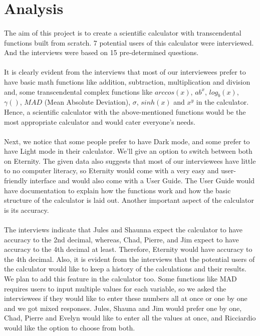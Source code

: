 \section{Analysis}
    \paragraph{}
    The aim of this project is to create a scientific calculator with transcendental functions built from scratch. 7 potential users of this calculator were interviewed. And the interviews were based on 15 pre-determined questions.

    \paragraph{}
    It is clearly evident from the interviews that most of our interviewees prefer to have basic math functions like addition, subtraction, multiplication and division and, some transcendental complex functions like $arccos(x)$, $ab^x$, $log_b(x)$, $\gamma ()$, $MAD$ (Mean Absolute Deviation), $\sigma$, $sinh(x)$ and $x^y$ in the calculator. Hence, a scientific calculator with the above-mentioned functions would be the most appropriate calculator and would cater everyone’s needs.

    \paragraph{}
    Next, we notice that some people prefer to have Dark mode, and some prefer to have Light mode in their calculator. We’ll give an option to switch between both on Eternity. The given data also suggests that most of our interviewees have little to no computer literacy, so Eternity would come with a very easy and user-friendly interface and would also come with a User Guide. The User Guide would have documentation to explain how the functions work and how the basic structure of the calculator is laid out. Another important aspect of the calculator is its accuracy.

    \paragraph{}
    The interviews indicate that Jules and Shaunna expect the calculator to have accuracy to the 2nd decimal, whereas, Chad, Pierre, and Jim expect to have accuracy to the 4th decimal at least. Therefore, Eternity would have accuracy to the 4th decimal. Also, it is evident from the interviews that the potential users of the calculator would like to keep a history of the calculations and their results. We plan to add this feature in the calculator too. Some functions like MAD  requires users to input multiple values for each variable, so we asked the interviewees if they would like to enter these numbers all at once or one by one and we got mixed responses. Jules, Shauna and Jim would prefer one by one, Chad, Pierre and Evelyn would like to enter all the values at once, and Ricciardio would like the option to choose from both.

